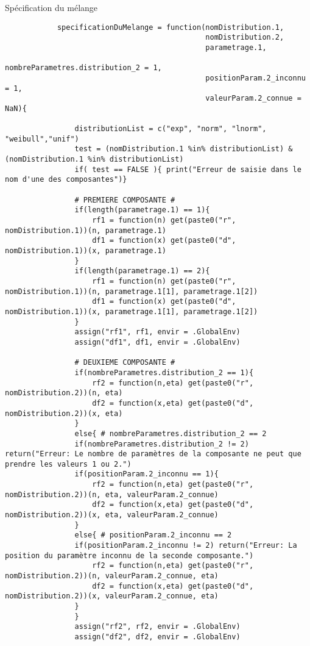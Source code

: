 \documentclass{article}
\begin{document}
    \begin{script}[h!]
        \caption{Spécification du mélange}
        \begin{verbatim}
            specificationDuMelange = function(nomDistribution.1, 
                                              nomDistribution.2, 
                                              parametrage.1, 
                                              nombreParametres.distribution_2 = 1,
                                              positionParam.2_inconnu = 1,
                                              valeurParam.2_connue = NaN){

                distributionList = c("exp", "norm", "lnorm", "weibull","unif")
                test = (nomDistribution.1 %in% distributionList) & (nomDistribution.1 %in% distributionList)
                if( test == FALSE ){ print("Erreur de saisie dans le nom d'une des composantes")}

                # PREMIERE COMPOSANTE # 
                if(length(parametrage.1) == 1){
                    rf1 = function(n) get(paste0("r", nomDistribution.1))(n, parametrage.1) 
                    df1 = function(x) get(paste0("d", nomDistribution.1))(x, parametrage.1)
                }
                if(length(parametrage.1) == 2){
                    rf1 = function(n) get(paste0("r", nomDistribution.1))(n, parametrage.1[1], parametrage.1[2])
                    df1 = function(x) get(paste0("d", nomDistribution.1))(x, parametrage.1[1], parametrage.1[2])
                }
                assign("rf1", rf1, envir = .GlobalEnv)
                assign("df1", df1, envir = .GlobalEnv)

                # DEUXIEME COMPOSANTE #
                if(nombreParametres.distribution_2 == 1){
                    rf2 = function(n,eta) get(paste0("r", nomDistribution.2))(n, eta)
                    df2 = function(x,eta) get(paste0("d", nomDistribution.2))(x, eta)
                }
                else{ # nombreParametres.distribution_2 == 2
                if(nombreParametres.distribution_2 != 2) return("Erreur: Le nombre de paramètres de la composante ne peut que prendre les valeurs 1 ou 2.")
                if(positionParam.2_inconnu == 1){
                    rf2 = function(n,eta) get(paste0("r", nomDistribution.2))(n, eta, valeurParam.2_connue)
                    df2 = function(x,eta) get(paste0("d", nomDistribution.2))(x, eta, valeurParam.2_connue)
                }
                else{ # positionParam.2_inconnu == 2
                if(positionParam.2_inconnu != 2) return("Erreur: La position du paramètre inconnu de la seconde composante.")
                    rf2 = function(n,eta) get(paste0("r", nomDistribution.2))(n, valeurParam.2_connue, eta)
                    df2 = function(x,eta) get(paste0("d", nomDistribution.2))(x, valeurParam.2_connue, eta)
                }
                }
                assign("rf2", rf2, envir = .GlobalEnv)
                assign("df2", df2, envir = .GlobalEnv)


\end{verbatim}
\end{script}
\end{document}
